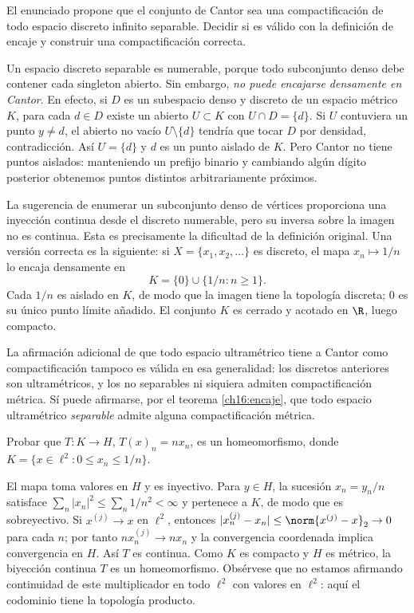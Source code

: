 \begin{ejercicio}
El enunciado propone que el conjunto de Cantor sea una compactificación de todo espacio discreto infinito separable. Decidir si es válido con la definición de encaje y construir una compactificación correcta.
\end{ejercicio}
\begin{solucion}
Un espacio discreto separable es numerable, porque todo subconjunto denso debe contener cada singleton abierto. Sin embargo, \emph{no puede encajarse densamente en Cantor}. En efecto, si $D$ es un subespacio denso y discreto de un espacio métrico $K$, para cada $d\in D$ existe un abierto $U\subset K$ con $U\cap D=\{d\}$. Si $U$ contuviera un punto $y\ne d$, el abierto no vacío $U\setminus\{d\}$ tendría que tocar $D$ por densidad, contradicción. Así $U=\{d\}$ y $d$ es un punto aislado de $K$. Pero Cantor no tiene puntos aislados: manteniendo un prefijo binario y cambiando algún dígito posterior obtenemos puntos distintos arbitrariamente próximos.

La sugerencia de enumerar un subconjunto denso de vértices proporciona una inyección continua desde el discreto numerable, pero su inversa sobre la imagen no es continua. Esta es precisamente la dificultad de la definición original. Una versión correcta es la siguiente: si $X=\{x_1,x_2,\ldots\}$ es discreto, el mapa $x_n\mapsto1/n$ lo encaja densamente en
\[
K=\{0\}\cup\{1/n:n\ge1\}.
\]
Cada $1/n$ es aislado en $K$, de modo que la imagen tiene la topología discreta; $0$ es su único punto límite añadido. El conjunto $K$ es cerrado y acotado en $\R$, luego compacto.

La afirmación adicional de que todo espacio ultramétrico tiene a Cantor como compactificación tampoco es válida en esa generalidad: los discretos anteriores son ultramétricos, y los no separables ni siquiera admiten compactificación métrica. Sí puede afirmarse, por el teorema \ref{ch16:encaje}, que todo espacio ultramétrico \emph{separable} admite alguna compactificación métrica.
\end{solucion}

\begin{ejercicio}
Probar que $T:K\to H$, $T(x)_n=nx_n$, es un homeomorfismo, donde $K=\{x\in\ell^2:0\le x_n\le1/n\}$.
\end{ejercicio}
\begin{solucion}
El mapa toma valores en $H$ y es inyectivo. Para $y\in H$, la sucesión $x_n=y_n/n$ satisface $\sum_n|x_n|^2\le\sum_n1/n^2<\infty$ y pertenece a $K$, de modo que es sobreyectivo. Si $x^{(j)}\to x$ en $\ell^2$, entonces $|x_n^{(j)}-x_n|\le\norm{x^{(j)}-x}_2\to0$ para cada $n$; por tanto $nx_n^{(j)}\to nx_n$ y la convergencia coordenada implica convergencia en $H$. Así $T$ es continua. Como $K$ es compacto y $H$ es métrico, la biyección continua $T$ es un homeomorfismo. Obsérvese que no estamos afirmando continuidad de este multiplicador en todo $\ell^2$ con valores en $\ell^2$: aquí el codominio tiene la topología producto.
\end{solucion}

